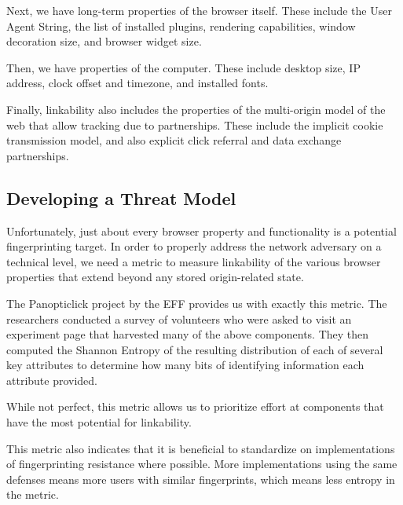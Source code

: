 \documentclass[letterpaper,11pt]{llncs}
\begin{document}
Next, we have long-term properties of the browser itself. These include the
User Agent String, the list of installed plugins, rendering capabilities,
window decoration size, and browser widget size.

Then, we have properties of the computer. These include desktop size, IP
address, clock offset and timezone, and installed fonts.

Finally, linkability also includes the properties of the multi-origin model of
the web that allow tracking due to partnerships. These include the implicit
cookie transmission model, and also explicit click referral and data exchange
partnerships.

\subsection{Developing a Threat Model}

Unfortunately, just about every browser property and functionality is a
potential fingerprinting target. In order to properly address the network
adversary on a technical level, we need a metric to measure linkability of the
various browser properties that extend beyond any stored origin-related state.

The Panopticlick project by the EFF provides us with exactly this
metric\cite{panopticlick}. The researchers conducted a survey of volunteers
who were asked to visit an experiment page that harvested many of the above
components. They then computed the Shannon Entropy of the resulting
distribution of each of several key attributes to determine how many bits of
identifying information each attribute provided.

While not perfect\footnotemark, this metric allows us to prioritize effort at
components that have the most potential for linkability.


This metric also indicates that it is beneficial to standardize on
implementations of fingerprinting resistance where possible. More
implementations using the same defenses means more users with similar
fingerprints, which means less entropy in the metric.
\end{document}
